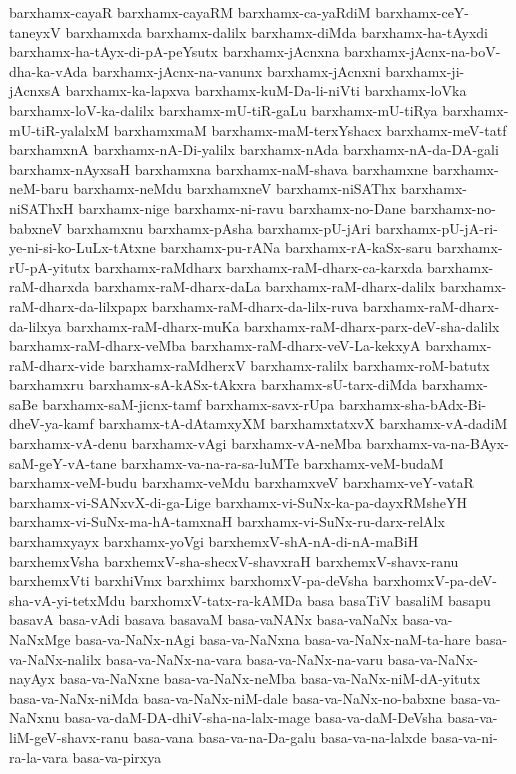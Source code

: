 {barxhamx-cayaR
barxhamx-cayaRM
barxhamx-ca-yaRdiM
barxhamx-ceY-taneyxV
barxhamxda
barxhamx-dalilx
barxhamx-diMda
barxhamx-ha-tAyxdi
barxhamx-ha-tAyx-di-pA-peYsutx
barxhamx-jAcnxna
barxhamx-jAcnx-na-boV-dha-ka-vAda
barxhamx-jAcnx-na-vanunx
barxhamx-jAcnxni
barxhamx-ji-jAcnxsA
barxhamx-ka-lapxva
barxhamx-kuM-Da-li-niVti
barxhamx-loVka
barxhamx-loV-ka-dalilx
barxhamx-mU-tiR-gaLu
barxhamx-mU-tiRya
barxhamx-mU-tiR-yalalxM
barxhamxmaM
barxhamx-maM-terxYshacx
barxhamx-meV-tatf
barxhamxnA
barxhamx-nA-Di-yalilx
barxhamx-nAda
barxhamx-nA-da-DA-gali
barxhamx-nAyxsaH
barxhamxna
barxhamx-naM-shava
barxhamxne
barxhamx-neM-baru
barxhamx-neMdu
barxhamxneV
barxhamx-niSAThx
barxhamx-niSAThxH
barxhamx-nige
barxhamx-ni-ravu
barxhamx-no-Dane
barxhamx-no-babxneV
barxhamxnu
barxhamx-pAsha
barxhamx-pU-jAri
barxhamx-pU-jA-ri-ye-ni-si-ko-LuLx-tAtxne
barxhamx-pu-rANa
barxhamx-rA-kaSx-saru
barxhamx-rU-pA-yitutx
barxhamx-raMdharx
barxhamx-raM-dharx-ca-karxda
barxhamx-raM-dharxda
barxhamx-raM-dharx-daLa
barxhamx-raM-dharx-dalilx
barxhamx-raM-dharx-da-lilxpapx
barxhamx-raM-dharx-da-lilx-ruva
barxhamx-raM-dharx-da-lilxya
barxhamx-raM-dharx-muKa
barxhamx-raM-dharx-parx-deV-sha-dalilx
barxhamx-raM-dharx-veMba
barxhamx-raM-dharx-veV-La-kekxyA
barxhamx-raM-dharx-vide
barxhamx-raMdherxV
barxhamx-ralilx
barxhamx-roM-batutx
barxhamxru
barxhamx-sA-kASx-tAkxra
barxhamx-sU-tarx-diMda
barxhamx-saBe
barxhamx-saM-jicnx-tamf
barxhamx-savx-rUpa
barxhamx-sha-bAdx-Bi-dheV-ya-kamf
barxhamx-tA-dAtamxyXM
barxhamxtatxvX
barxhamx-vA-dadiM
barxhamx-vA-denu
barxhamx-vAgi
barxhamx-vA-neMba
barxhamx-va-na-BAyx-saM-geY-vA-tane
barxhamx-va-na-ra-sa-luMTe
barxhamx-veM-budaM
barxhamx-veM-budu
barxhamx-veMdu
barxhamxveV
barxhamx-veY-vataR
barxhamx-vi-SANxvX-di-ga-Lige
barxhamx-vi-SuNx-ka-pa-dayxRMsheYH
barxhamx-vi-SuNx-ma-hA-tamxnaH
barxhamx-vi-SuNx-ru-darx-relAlx
barxhamxyayx
barxhamx-yoVgi
barxhemxV-shA-nA-di-nA-maBiH
barxhemxVsha
barxhemxV-sha-shecxV-shavxraH
barxhemxV-shavx-ranu
barxhemxVti
barxhiVmx
barxhimx
barxhomxV-pa-deVsha
barxhomxV-pa-deV-sha-vA-yi-tetxMdu
barxhomxV-tatx-ra-kAMDa
basa
basaTiV
basaliM
basapu
basavA
basa-vAdi
basava
basavaM
basa-vaNANx
basa-vaNaNx
basa-va-NaNxMge
basa-va-NaNx-nAgi
basa-va-NaNxna
basa-va-NaNx-naM-ta-hare
basa-va-NaNx-nalilx
basa-va-NaNx-na-vara
basa-va-NaNx-na-varu
basa-va-NaNx-nayAyx
basa-va-NaNxne
basa-va-NaNx-neMba
basa-va-NaNx-niM-dA-yitutx
basa-va-NaNx-niMda
basa-va-NaNx-niM-dale
basa-va-NaNx-no-babxne
basa-va-NaNxnu
basa-va-daM-DA-dhiV-sha-na-lalx-mage
basa-va-daM-DeVsha
basa-va-liM-geV-shavx-ranu
basa-vana
basa-va-na-Da-galu
basa-va-na-lalxde
basa-va-ni-ra-la-vara
basa-va-pirxya
}
